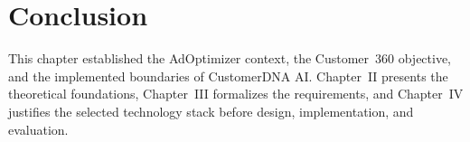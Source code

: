 \section{Conclusion}
This chapter established the AdOptimizer context, the Customer~360 objective, and the implemented boundaries of CustomerDNA AI. Chapter~II presents the theoretical foundations, Chapter~III formalizes the requirements, and Chapter~IV justifies the selected technology stack before design, implementation, and evaluation.
